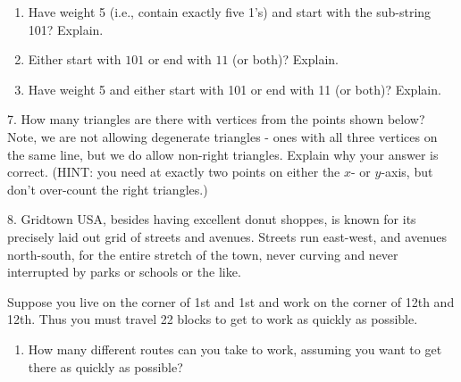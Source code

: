 \documentclass[10pt,]{book}
\theoremstyle{plain}
\theoremstyle{definition}
\theoremstyle{definition}
\theoremstyle{definition}
\numberwithin{equation}{section}
\begin{document}
\begin{exerciselist}
\begin{enumerate}[label=(\alph*)]
                
\item\hypertarget{li-785}{}
                Have weight 5 (i.e., contain exactly five 1's) and start with the sub-string 101? Explain.

                
\item\hypertarget{li-786}{}
                Either start with \(101\) or end with \(11\) (or both)? Explain.

                
\item\hypertarget{li-787}{}
                Have weight 5 and either start with 101 or end with 11 (or both)? Explain.

                
\end{enumerate}
\par\smallskip
\item[7.]\hypertarget{exercise-130}{}
            How many triangles are there with vertices from the points shown below? Note, we are not allowing degenerate triangles - ones with all three vertices on the same line, but we do allow non-right triangles. Explain why your answer is correct. (HINT: you need at exactly two points on either the \(x\)- or \(y\)-axis, but don't over-count the right triangles.)
\leavevmode%
\begin{figure}
\centering
{
}
\end{figure}
\par\smallskip
\item[8.]\hypertarget{exercise-131}{}
            Gridtown USA, besides having excellent donut shoppes, is known for its precisely laid out grid of streets and avenues. Streets run east-west, and avenues north-south, for the entire stretch of the town, never curving and never interrupted by parks or schools or the like.
\par

            Suppose you live on the corner of 1st and 1st and work on the corner of 12th and 12th. Thus you must travel 22 blocks to get to work as quickly as possible.
\leavevmode%
\begin{enumerate}[label=(\alph*)]
\item\hypertarget{li-788}{}
                How many different routes can you take to work, assuming you want to get there as quickly as possible?


\end{enumerate}
\end{exerciselist}
\end{document}
